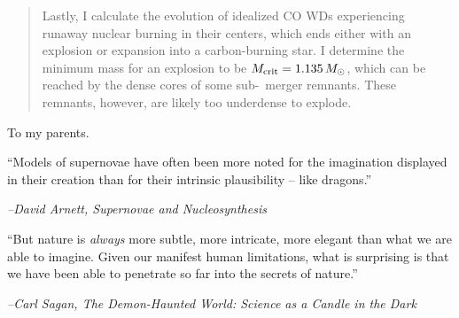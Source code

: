 \documentclass{ut-thesis}
\begin{document}
\begin{preliminary}
\begin{abstract}
Lastly, I calculate the evolution of idealized CO WDs experiencing runaway nuclear burning in their centers, which ends either with an explosion or expansion into a carbon-burning star.  I determine the minimum mass for an explosion to be $\Mcrit = 1.135\,\Msun$, which can be reached by the dense cores of some sub-\Mch\ merger remnants.  These remnants, however, are likely too underdense to explode.

\end{abstract}


\begin{dedication}
To my parents.
\end{dedication}

\vspace*{\fill}
\begin{center}
\begin{minipage}[c]{4.75in}
``Models of supernovae have often been more noted for the imagination displayed in their creation than for their intrinsic plausibility -- like dragons.''\vspace{2em}

\hfill \emph{--David Arnett, Supernovae and Nucleosynthesis}\vspace{4em}

``But nature is \textit{always} more subtle, more intricate, more elegant than what we are able to imagine.  Given our manifest human limitations, what is surprising is that we have been able to penetrate so far into the secrets of nature.''\vspace{2em}

\hfill \emph{--Carl Sagan, The Demon-Haunted World: Science as a Candle in the Dark}

\end{minipage}
\end{center}
\vspace*{\fill}



\end{preliminary}
\end{document}
